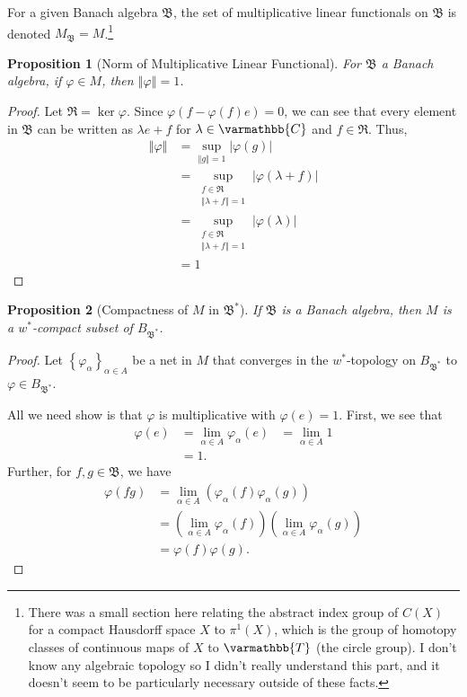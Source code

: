 \documentclass[12pt]{extarticle}
\newcommand{\C}{\mathbb{C}}
\newcommand{\norm}[1]{\left\Vert #1\right\Vert}
\newcommand{\set}[1]{\left\{#1\right\}}
\theoremstyle{plain}
\newtheorem*{proposition}{Proposition}
\theoremstyle{definition}
\theoremstyle{note}
\renewcommand*{\mathbb}[1]{\varmathbb{#1}}
\renewcommand{\newline}{\hfill\break}
\begin{document}
For a given Banach algebra $\mathfrak{B}$, the set of multiplicative linear functionals on $\mathfrak{B}$ is denoted $M_{\mathfrak{B}} = M$.\footnote{There was a small section here relating the abstract index group of $C(X)$ for a compact Hausdorff space $X$ to $\pi^1(X)$, which is the group of homotopy classes of continuous maps of $X$ to $\mathbb{T}$ (the circle group). I don't know any algebraic topology so I didn't really understand this part, and it doesn't seem to be particularly necessary outside of these facts.}
\begin{proposition}[Norm of Multiplicative Linear Functional]
  For $\mathfrak{B}$ a Banach algebra, if $\varphi \in M$, then $\norm{\varphi} = 1$.
\end{proposition}
\begin{proof}
  Let $\mathfrak{R} = \ker\varphi$. Since $\varphi(f - \varphi(f)e) = 0$, we can see that every element in $\mathfrak{B}$ can be written as $\lambda e + f$ for $\lambda \in \C$ and $f \in \mathfrak{R}$. Thus,
  \begin{align*}
    \norm{\varphi} &= \sup_{\norm{g} = 1}\left\vert \varphi(g) \right\vert\\
                   &= \sup_{\substack{f\in \mathfrak{R}\\\norm{\lambda + f} = 1}}\left\vert \varphi(\lambda + f) \right\vert\\
                   &= \sup_{\substack{f\in \mathfrak{R}\\\norm{\lambda + f} = 1}} \left\vert \varphi(\lambda) \right\vert\\
                   &= 1
  \end{align*}
\end{proof}
\begin{proposition}[Compactness of $M$ in $\mathfrak{B}^{\ast}$]
  If $\mathfrak{B}$ is a Banach algebra, then $M$ is a $w^{\ast}$-compact subset of $B_{\mathfrak{B}^{\ast}}$.
\end{proposition}
\begin{proof}
  Let $\set{\varphi_{\alpha}}_{\alpha \in A}$ be a net in $M$ that converges in the $w^{\ast}$-topology on $B_{\mathfrak{B}^{\ast}}$ to $\varphi \in B_{\mathfrak{B}^{\ast}}$.\newline

  All we need show is that $\varphi$ is multiplicative with $\varphi(e) = 1$. First, we see that
  \begin{align*}
    \varphi(e) &= \lim_{\alpha \in A}\varphi_{\alpha}(e)
               &= \lim_{\alpha \in A} 1\\
               &= 1.
  \end{align*}
  Further, for $f,g\in \mathfrak{B}$, we have
  \begin{align*}
    \varphi(fg) &= \lim_{\alpha \in A}\left(\varphi_{\alpha}(f)\varphi_{\alpha}(g)\right)\\
                &= \left(\lim_{\alpha \in A}\varphi_{\alpha}(f)\right)\left(\lim_{\alpha \in A}\varphi_{\alpha}(g)\right)\\
                &= \varphi(f)\varphi(g).
  \end{align*}
\end{proof}
\end{document}
